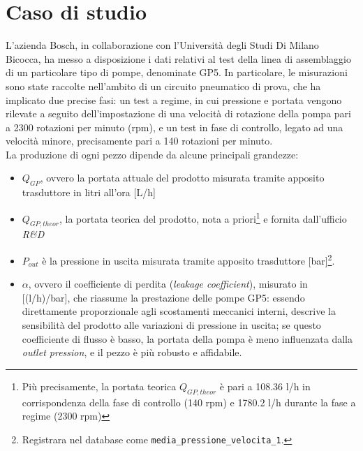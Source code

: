\documentclass[fleqn,10pt]{SelfArx} %
\affiliation{\textsuperscript{1}\textit{794126, Dipartimento di Informatica, Sistemistica e Comunicazione}} %
\affiliation{\textsuperscript{2}\textit{793516, Dipartimento di Informatica, Sistemistica e Comunicazione}} %
\affiliation{\textsuperscript{3}\textit{850334, Dipartimento di Informatica, Sistemistica e Comunicazione}}
\begin{document}
\flushbottom %

\maketitle %

\tableofcontents %

\thispagestyle{empty} %


\section{Caso di studio}
L'azienda Bosch, in collaborazione con l'Università degli Studi Di Milano Bicocca, ha messo a disposizione i dati relativi al test della linea di assemblaggio di un particolare tipo di pompe, denominate GP5. In particolare, le misurazioni sono state raccolte nell'ambito di un circuito pneumatico di prova, che ha implicato due precise fasi: un test a regime, in cui pressione e portata vengono rilevate a seguito dell'impostazione di una velocità di rotazione della pompa pari a 2300 rotazioni per minuto (rpm), e un test in fase di controllo, legato ad una velocità minore, precisamente pari a 140 rotazioni per minuto.\\
La produzione di ogni pezzo dipende da alcune principali grandezze: 
\begin{itemize}
    \item $Q_{GP}$, ovvero la portata attuale del prodotto misurata tramite apposito trasduttore in litri all'ora [L/h]
    \item $Q_{GP,theor}$, la portata teorica del prodotto, nota a priori\footnote{Più precisamente, la portata teorica $Q_{GP,theor}$ è pari a 108.36 l/h in corrispondenza della fase di controllo (140 rpm) e 1780.2 l/h durante la fase a regime (2300 rpm)} e fornita dall’ufficio \textit{R\&D}
    \item $P_{out}$ è la pressione in uscita misurata tramite apposito trasduttore [bar]\footnote{Registrara nel database come \texttt{media\_pressione\_velocita\_1}.}.
    \item $\alpha$, ovvero il coefficiente di perdita (\textit{leakage coefficient}), misurato in [(l/h)/bar], che riassume la prestazione delle pompe GP5: essendo direttamente proporzionale agli scostamenti meccanici interni, descrive la sensibilità del prodotto alle variazioni di pressione in uscita; se questo coefficiente di flusso è basso, la portata della pompa è meno influenzata dalla \textit{outlet pression}, e il pezzo è più robusto e affidabile.
\end{itemize}
\end{document}
